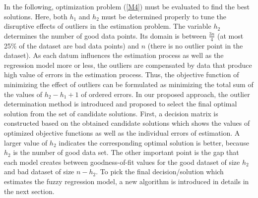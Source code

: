 \documentclass{IJFS}
\begin{document}
In the following, optimization problem (\ref{M4}) must be evaluated to find the best solutions. %
Here, both $h_1$ and $h_2$ must be determined properly to  tune the disruptive effects of outliers in the estimation problem.
The variable $h_2$ determines  the number  of good data points.
Its domain is between $\frac{3n}{4}$ (at most 25\%  of the dataset are bad data points) and $n$ (there is no outlier point in the dataset).
As each datum influences the estimation process as well as the regression model more or less, the outliers are compensated by data that produce high value of errors in the estimation process.
Thus, the objective function of minimizing the effect of outliers can be formulated as minimizing the total sum of the values of $h_2-h_1+1$ of ordered errors.
In our proposed approach, the outlier determination method is introduced and proposed to select the final optimal solution from the set of candidate solutions.
First, a decision matrix is constructed based on the obtained candidate solutions which shows the values of optimized objective functions as well as the individual errors of estimation.
A larger value of $h_2$  indicates the corresponding optimal solution is better, because $h_2$ is the number of good data set.
The other important point is the gap that each model creates between goodness-of-fit values for the good dataset of size $h_2$ and bad dataset of size $n-h_2$.
To pick the final decision/solution which estimates the fuzzy regression model, a new algorithm is introduced in details in the next section.
\end{document}
